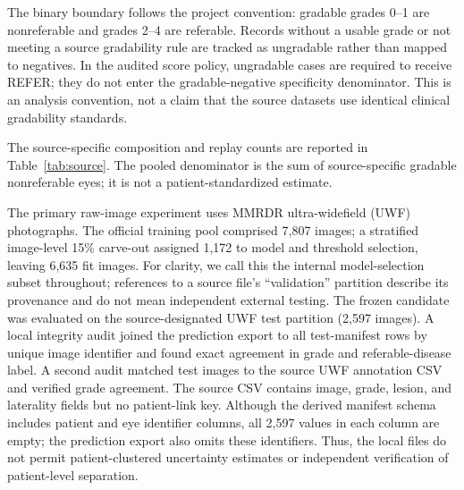 \documentclass{ieeeaccess}
\begin{document}
The binary boundary follows the project convention: gradable grades 0--1 are nonreferable and grades 2--4 are referable. Records without a usable grade or not meeting a source gradability rule are tracked as ungradable rather than mapped to negatives. In the audited score policy, ungradable cases are required to receive REFER; they do not enter the gradable-negative specificity denominator. This is an analysis convention, not a claim that the source datasets use identical clinical gradability standards.

The source-specific composition and replay counts are reported in Table~\ref{tab:source}. The pooled denominator is the sum of source-specific gradable nonreferable eyes; it is not a patient-standardized estimate.

The primary raw-image experiment uses MMRDR ultra-widefield (UWF) photographs. The official training pool comprised 7,807 images; a stratified image-level 15\% carve-out assigned 1,172 to model and threshold selection, leaving 6,635 fit images. For clarity, we call this the internal model-selection subset throughout; references to a source file's ``validation'' partition describe its provenance and do not mean independent external testing. The frozen candidate was evaluated on the source-designated UWF test partition (2,597 images). A local integrity audit joined the prediction export to all test-manifest rows by unique image identifier and found exact agreement in grade and referable-disease label. A second audit matched test images to the source UWF annotation CSV and verified grade agreement. The source CSV contains image, grade, lesion, and laterality fields but no patient-link key. Although the derived manifest schema includes patient and eye identifier columns, all 2,597 values in each column are empty; the prediction export also omits these identifiers. Thus, the local files do not permit patient-clustered uncertainty estimates or independent verification of patient-level separation.
\end{document}
